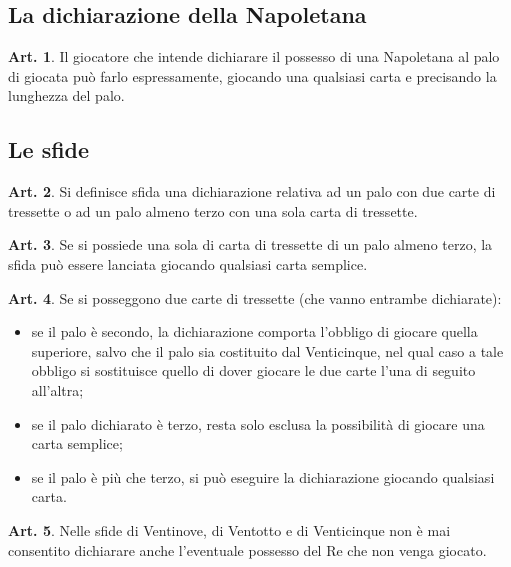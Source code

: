 \documentclass[italian,a4paper]{article}
\theoremstyle{definition}
\newtheorem{art}{Art.}
\begin{document}
\subsection*{La dichiarazione della Napoletana}

\begin{art}
Il giocatore che intende dichiarare il possesso di una Napoletana al palo di
giocata può farlo espressamente, giocando una qualsiasi carta e precisando
la lunghezza del palo.
\end{art}

\subsection*{Le sfide}

\begin{art}
Si definisce sfida una dichiarazione relativa ad un palo con due carte di
tressette o ad un palo almeno terzo con una sola carta di tressette.
\end{art}

\begin{art}
Se si possiede una sola di carta di tressette di un palo almeno terzo, la
sfida può essere lanciata giocando qualsiasi carta semplice.
\end{art}

\begin{art}
Se si posseggono due carte di tressette (che vanno entrambe dichiarate):

\begin{itemize}
\item  se il palo è secondo, la dichiarazione comporta l’obbligo di giocare
quella superiore, salvo che il palo sia costituito dal Venticinque, nel qual
caso a tale obbligo si sostituisce quello di dover giocare le due carte
l’una di seguito all’altra;

\item  se il palo dichiarato è terzo, resta solo esclusa la possibilità di
giocare una carta semplice;

\item   se il palo è più che terzo, si può eseguire la dichiarazione giocando
qualsiasi carta. 
\end{itemize}
\end{art}

\begin{art}
Nelle sfide di Ventinove, di Ventotto e di Venticinque non è mai consentito
dichiarare anche l’eventuale possesso del Re che non venga giocato.
\end{art}
\end{document}
